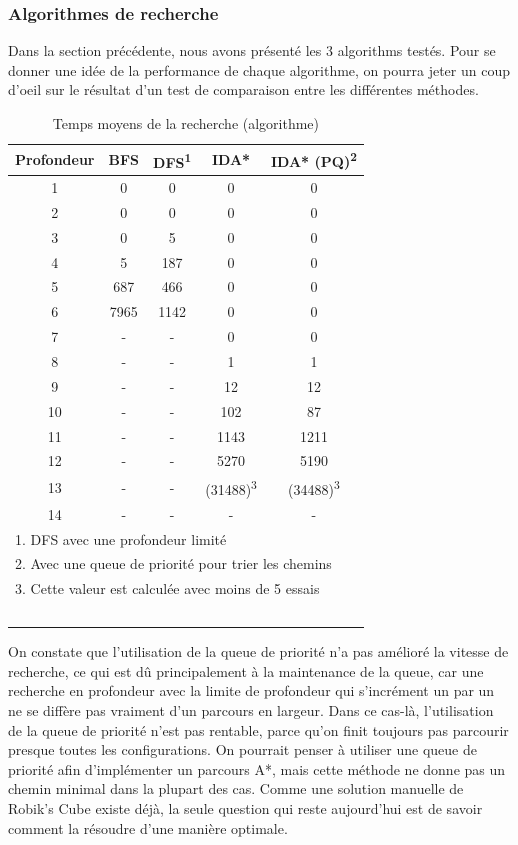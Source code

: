 \documentclass[fleqn,10pt,french]{SelfArx} %
\begin{document}
\subsubsection{Algorithmes de recherche}

Dans la section précédente, nous avons présenté les 3 algorithms testés. Pour se donner une idée de la performance de chaque algorithme, on pourra jeter un coup d’oeil sur le résultat d’un test de comparaison entre les différentes méthodes. 

\begin{table}[htbp]
\centering
\begin{tabular}{ccccc}
\hline
\rowcolor{blue!20} \rule{0pt}{12pt} \textbf{Profondeur} & \textbf{BFS} & \textbf{DFS}\textsuperscript{1} & \textbf{IDA*} &  \textbf{IDA* (PQ)\textsuperscript{2}}\\
\hline
1 & 0 & 0 & 0 & 0  \\
2 & 0 & 0 & 0 & 0 \\
3 & 0 & 5 & 0 & 0 \\
4 & 5 & 187 & 0 & 0 \\
5 & 687 & 466 & 0 & 0 \\
6 & 7965 & 1142 & 0 & 0  \\
7 & - & - & 0 & 0 \\
8 & - & - & 1 & 1 \\
9 & - & - & 12 & 12 \\
10 & - & - & 102 & 87 \\
11 & - & - & 1143 & 1211 \\
12 & - & - & 5270 & 5190 \\
13 & - & - & (31488)\textsuperscript{3} & (34488)\textsuperscript{3} \\
14 & - & - & - & - \\
\hline
\multicolumn{5}{l}{\small{1. DFS avec une profondeur limité}} \\
\multicolumn{5}{l}{\small{2. Avec une queue de priorité pour trier les chemins}} \\
\multicolumn{5}{l}{\small{3. Cette valeur est calculée avec moins de 5 essais}} \\
\hline
~\\
\end{tabular}
\caption{Temps moyens de la recherche (algorithme)}
\end{table}

\indent
On constate que l’utilisation de la queue de priorité n’a pas amélioré la vitesse de recherche, ce qui est dû principalement à la maintenance de la queue, car une recherche en profondeur avec la limite de profondeur qui s’incrément un par un ne se diffère pas vraiment d’un parcours en largeur. Dans ce cas-là, l’utilisation de la queue de priorité n’est pas rentable, parce qu’on finit toujours pas parcourir presque toutes les configurations. On pourrait penser à utiliser une queue de priorité afin d’implémenter un parcours A*, mais cette méthode ne donne pas un chemin minimal dans la plupart des cas. Comme une solution manuelle de Robik’s Cube existe déjà, la seule question qui reste aujourd’hui est de savoir comment la résoudre d’une manière optimale.
\end{document}

